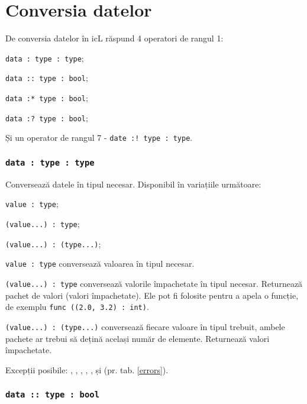 \section{Conversia datelor}

De conversia datelor în icL răspund 4 operatori de rangul 1:
\begin{icItems}
	\item \lstinline|data : type : type|;
	\item \lstinline|data :: type : bool|;
	\item \lstinline|data :* type : bool|;
	\item \lstinline|data :? type : bool|;
\end{icItems}

Și un operator de rangul 7 - \lstinline|date :! type : type|.

\subsubsection{\lstinline|data : type : type|}

Conversează datele în tipul necesar. Disponibil în variațiile următoare:
\begin{icItems}
	\item \lstinline|value : type|;
	\item \lstinline|(value...) : type|;
	\item \lstinline|(value...) : (type...)|;
\end{icItems}

\lstinline|value : type| conversează valoarea în tipul necesar.

\lstinline|(value...) : type| conversează valorile împachetate în tipul necesar. Returnează pachet de valori (valori împachetate). Ele pot fi folosite pentru a apela o funcție, de exemplu \lstinline|func ((2.0, 3.2) : int)|.

\lstinline|(value...) : (type...)| conversează fiecare valoare în tipul trebuit, ambele pachete ar trebui să dețină același număr de elemente. Returnează valori împachetate.

Excepții posibile: , , , , ,  și  (pr. tab. \ref{errors}).

\subsubsection{\lstinline|data :: type : bool|}

